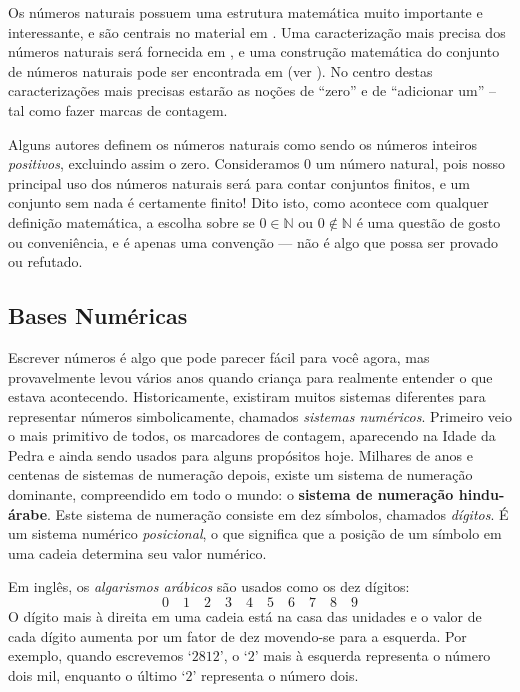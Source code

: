 Os números naturais possuem uma estrutura matemática muito importante e interessante, e são centrais no material em . Uma caracterização mais precisa dos números naturais será fornecida em , e uma construção matemática do conjunto de números naturais pode ser encontrada em  (ver ). No centro destas caracterizações mais precisas estarão as noções de “zero” e de “adicionar um” – tal como fazer marcas de contagem.

\begin{aside} %
Alguns autores definem os números naturais como sendo os números inteiros \textit{positivos}, excluindo assim o zero. Consideramos $0$ um número natural, pois nosso principal uso dos números naturais será para contar conjuntos finitos, e um conjunto sem nada é certamente finito! Dito isto, como acontece com qualquer definição matemática, a escolha sobre se $0 \in \mathbb{N}$ ou $0 \not \in \mathbb{N}$ é uma questão de gosto ou conveniência, e é apenas uma convenção --- não é algo que possa ser provado ou refutado.
\end{aside}

\subsection*{Bases Numéricas}

Escrever números é algo que pode parecer fácil para você agora, mas provavelmente levou vários anos quando criança para realmente entender o que estava acontecendo. Historicamente, existiram muitos sistemas diferentes para representar números simbolicamente, chamados \textit{sistemas numéricos}. Primeiro veio o mais primitivo de todos, os marcadores de contagem, aparecendo na Idade da Pedra e ainda sendo usados para alguns propósitos hoje. Milhares de anos e centenas de sistemas de numeração depois, existe um sistema de numeração dominante, compreendido em todo o mundo: o \textbf{sistema de numeração hindu-árabe}. Este sistema de numeração consiste em dez símbolos, chamados \textit{dígitos}. É um sistema numérico \textit{posicional}, o que significa que a posição de um símbolo em uma cadeia determina seu valor numérico.

Em inglês, os \textit{algarismos arábicos} são usados como os dez dígitos:
\[0 \quad 1 \quad 2 \quad 3 \quad 4 \quad 5 \quad 6 \quad 7 \quad 8 \quad 9 \]
O dígito mais à direita em uma cadeia está na casa das unidades e o valor de cada dígito aumenta por um fator de dez movendo-se para a esquerda. Por exemplo, quando escrevemos `$2812$', o `$2$' mais à esquerda representa o número dois mil, enquanto o último `$2$' representa o número dois.

